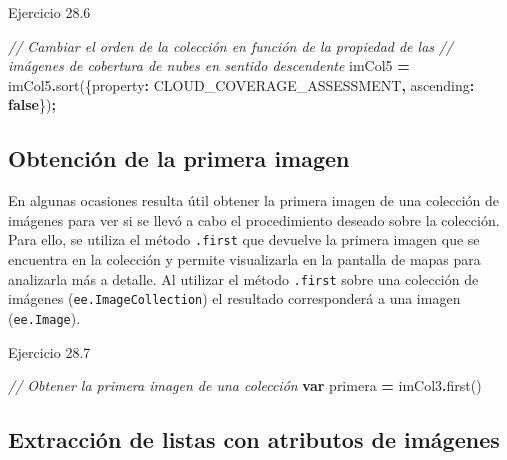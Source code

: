 \documentclass[
  12pt,
  letterpaper,
  twoside]{book}
\newenvironment{Shaded}{\begin{snugshade}}{\end{snugshade}}
\newcommand{\CommentTok}[1]{\textcolor[rgb]{0.56,0.35,0.01}{\textit{#1}}}
\newcommand{\DataTypeTok}[1]{\textcolor[rgb]{0.13,0.29,0.53}{#1}}
\newcommand{\FunctionTok}[1]{\textcolor[rgb]{0.00,0.00,0.00}{#1}}
\newcommand{\KeywordTok}[1]{\textcolor[rgb]{0.13,0.29,0.53}{\textbf{#1}}}
\newcommand{\NormalTok}[1]{#1}
\newcommand{\OperatorTok}[1]{\textcolor[rgb]{0.81,0.36,0.00}{\textbf{#1}}}
\newcommand{\StringTok}[1]{\textcolor[rgb]{0.31,0.60,0.02}{#1}}
\begin{document}
Ejercicio 28.6

\begin{Shaded}
\begin{Highlighting}[]
\CommentTok{// Cambiar el orden de la colección en función de la propiedad de las }
\CommentTok{// imágenes de cobertura de nubes en sentido descendente}
\NormalTok{imCol5 }\OperatorTok{=}\NormalTok{ imCol5}\OperatorTok{.}\FunctionTok{sort}\NormalTok{(\{}\DataTypeTok{property}\OperatorTok{:} \StringTok{\textquotesingle{}CLOUD\_COVERAGE\_ASSESSMENT\textquotesingle{}}\OperatorTok{,} 
  \DataTypeTok{ascending}\OperatorTok{:} \KeywordTok{false}\NormalTok{\})}\OperatorTok{;}
\end{Highlighting}
\end{Shaded}

\hypertarget{obtenciuxf3n-de-la-primera-imagen}{%
\subsection*{Obtención de la primera imagen}\label{obtenciuxf3n-de-la-primera-imagen}}

En algunas ocasiones resulta útil obtener la primera imagen de una colección de imágenes para ver si se llevó a cabo el procedimiento deseado sobre la colección. Para ello, se utiliza el método \texttt{.first} que devuelve la primera imagen que se encuentra en la colección y permite visualizarla en la pantalla de mapas para analizarla más a detalle. Al utilizar el método \texttt{.first} sobre una colección de imágenes (\texttt{ee.ImageCollection}) el resultado corresponderá a una imagen (\texttt{ee.Image}).

Ejercicio 28.7

\begin{Shaded}
\begin{Highlighting}[]
\CommentTok{// Obtener la primera imagen de una colección}
\KeywordTok{var}\NormalTok{ primera }\OperatorTok{=}\NormalTok{ imCol3}\OperatorTok{.}\FunctionTok{first}\NormalTok{()}
\end{Highlighting}
\end{Shaded}

\hypertarget{extracciuxf3n-de-listas-con-atributos-de-imuxe1genes}{%
\subsection*{Extracción de listas con atributos de imágenes}\label{extracciuxf3n-de-listas-con-atributos-de-imuxe1genes}}
\end{document}
